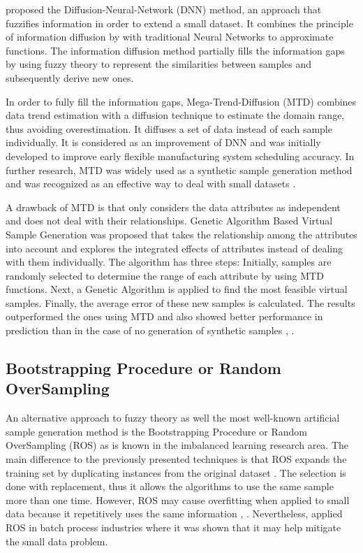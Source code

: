 \cite{Huang.2004} proposed the Diffusion-Neural-Network (DNN) method, an approach that fuzzifies information in order to extend a small dataset. It combines the principle of information diffusion by \cite{Huang.1997} with traditional Neural Networks to approximate functions. The information diffusion method partially fills the information gaps by using fuzzy theory to represent the similarities between samples and subsequently derive new ones.

In order to fully fill the information gaps, Mega-Trend-Diffusion (MTD) \cite{Li.2007} combines data trend estimation with a diffusion technique to estimate the domain range, thus avoiding overestimation. It diffuses a set of data instead of each sample individually. It is considered as an improvement of DNN and was initially developed to improve early flexible manufacturing system scheduling accuracy. In further research, MTD was widely used as a synthetic sample generation method and was recognized as an effective way to deal with small datasets \cite{AbdulLateh.2017}.

A drawback of MTD is that only considers the data attributes as independent and does not deal with their relationships. Genetic Algorithm Based Virtual Sample Generation was proposed that takes the relationship among the attributes into account and explores the integrated effects of attributes instead of dealing with them individually. The algorithm has three steps: Initially, samples are randomly selected to determine the range of each attribute by using MTD functions. Next, a Genetic Algorithm is applied to find the most feasible virtual samples. Finally, the average error of these new samples is calculated. The results outperformed the ones using MTD and also showed better performance in prediction than in the case of no generation of synthetic samples \cite{Li.2014}, \cite{Lin.2010}.

\subsection{Bootstrapping Procedure or Random OverSampling}

An alternative approach to fuzzy theory as well the most well-known artificial sample generation method is the Bootstrapping Procedure \cite{AbdulLateh.2017} or Random OverSampling (ROS) as is known in the imbalanced learning research area. The main difference to the previously presented techniques is that ROS expands the training set by duplicating instances from the original dataset \cite{Efron.1993}. The selection is done with replacement, thus it allows the algorithms to use the same sample more than one time. However, ROS may cause overfitting when applied to small data because it repetitively uses the same information \cite{Tsai.2015}, \cite{Li.2018}. Nevertheless, \cite{Ivanescu.2006} applied ROS in batch process industries where it was shown that it may help mitigate the small data problem.

